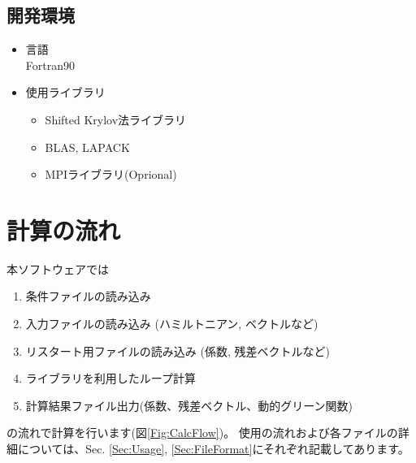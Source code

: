 \documentclass[12pt,titlepage]{jarticle}
\begin{document}
\subsection{開発環境}

\begin{itemize}
\item{言語}\\
 Fortran90

 \item{使用ライブラリ}
   \begin{itemize}
   \item{Shifted Krylov法ライブラリ}
   \item{BLAS, LAPACK}
   \item{MPIライブラリ(Oprional)}
   \end{itemize}

\end{itemize}

\newpage
\section{計算の流れ}
本ソフトウェアでは
\begin{enumerate}
\item{条件ファイルの読み込み}
\item{入力ファイルの読み込み (ハミルトニアン, ベクトルなど)}
\item{リスタート用ファイルの読み込み (係数, 残差ベクトルなど)}
\item{ライブラリを利用したループ計算}
\item{計算結果ファイル出力(係数、残差ベクトル、動的グリーン関数)}
\end{enumerate}
の流れで計算を行います(図\ref{Fig:CalcFlow})。
使用の流れおよび各ファイルの詳細については、Sec. \ref{Sec:Usage}, \ref{Sec:FileFormat}にそれぞれ記載してあります。
\end{document}
